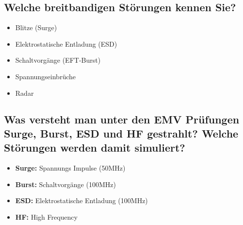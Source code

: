 \subsection{Welche breitbandigen Störungen kennen Sie?}
\begin{itemize}
  \item Blitze (Surge)
  \item Elektrostatische Entladung (ESD)
  \item Schaltvorgänge (EFT-Burst)
  \item Spannungseinbrüche
  \item Radar
\end{itemize}

\subsection{Was versteht man unter den EMV Prüfungen Surge, Burst, ESD und HF gestrahlt? Welche Störungen werden damit simuliert?}
\begin{itemize}
  \item \textbf{Surge:} Spannungs Impulse (50MHz)
  \item \textbf{Burst:} Schaltvorgänge (100MHz)
  \item \textbf{ESD:} Elektrostatische Entladung (100MHz)
  \item \textbf{HF:} High Frequency
\end{itemize}

